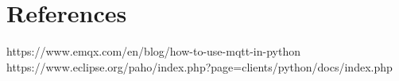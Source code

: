 \documentclass[12pt]{article}
\begin{document}
\section{References}

https://www.emqx.com/en/blog/how-to-use-mqtt-in-python
https://www.eclipse.org/paho/index.php?page=clients/python/docs/index.php
\end{document}

